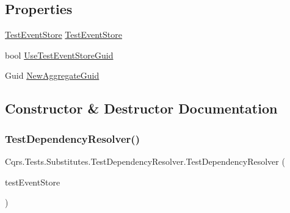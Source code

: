 \subsection*{Properties}
\begin{DoxyCompactItemize}
\item 
\hyperlink{classCqrs_1_1Tests_1_1Substitutes_1_1TestEventStore}{Test\+Event\+Store} \hyperlink{classCqrs_1_1Tests_1_1Substitutes_1_1TestDependencyResolver_a1102f66163e9313777a41fff54aa5a75}{Test\+Event\+Store}
\item 
bool \hyperlink{classCqrs_1_1Tests_1_1Substitutes_1_1TestDependencyResolver_a000d2ee924b6f60bc77174495ad9ca89}{Use\+Test\+Event\+Store\+Guid}
\item 
Guid \hyperlink{classCqrs_1_1Tests_1_1Substitutes_1_1TestDependencyResolver_a8df7ff7fb6f8bd3b2da43fadd46f1cf8}{New\+Aggregate\+Guid}
\end{DoxyCompactItemize}


\subsection{Constructor \& Destructor Documentation}
\mbox{\label{classCqrs_1_1Tests_1_1Substitutes_1_1TestDependencyResolver_ab0ecd39381883a73869c061bc60ebff8}} 
\subsubsection{\texorpdfstring{Test\+Dependency\+Resolver()}{TestDependencyResolver()}}
{\footnotesize\ttfamily Cqrs.\+Tests.\+Substitutes.\+Test\+Dependency\+Resolver.\+Test\+Dependency\+Resolver (\begin{DoxyParamCaption}\item[{\hyperlink{classCqrs_1_1Tests_1_1Substitutes_1_1TestEventStore}{Test\+Event\+Store}}]{test\+Event\+Store }\end{DoxyParamCaption})}



